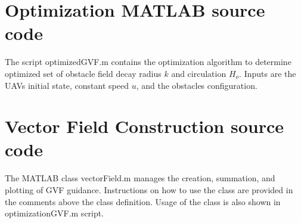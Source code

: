\documentclass[numbered,pdftex]{ohio-etd}
\begin{document}
\chapter{Optimization MATLAB source code}
The script optimizedGVF.m contains the optimization algorithm to determine optimized set of obstacle field decay radius $k$ and circulation $H_o$. Inputs are the UAVs initial state, constant speed $u$, and the obstacles configuration.  

\chapter{Vector Field Construction source code}
The MATLAB class vectorField.m manages the creation, summation, and plotting of GVF guidance. Instructions on how to use the class are provided in the comments above the class definition. Usage of the class is also shown in optimizationGVF.m script.


\end{document}
